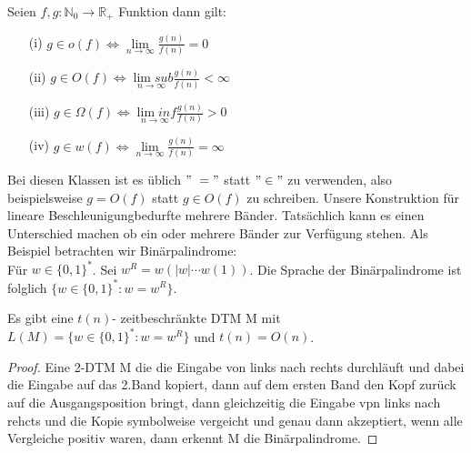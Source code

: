     Seien \(f, g : \mathbb{N}_0 \to \mathbb{R}_+\) Funktion dann gilt: 
    \begin{itemize}
        \item [(i)] \(g \in o(f) \Leftrightarrow \underset{n \to \infty}{\lim} \frac{g(n)}{f(n)} = 0\)
        \item [(ii)] \(g \in O(f) \Leftrightarrow \underset{n \to \infty}{\lim sub} \frac{g(n)}{f(n)} < \infty\)
        \item [(iii)] \(g \in \Omega(f) \Leftrightarrow \underset{n \to \infty}{\lim inf} \frac{g(n)}{f(n)} > 0\)
        \item [(iv)]\(g \in w(f) \Leftrightarrow \underset{n \to \infty}{\lim} \frac{g(n)}{f(n)} = \infty\)
    \end{itemize}
    Bei diesen Klassen ist es üblich \("\ = "\) statt \(" \in "\) zu verwenden, also beispielsweise \(g = O(f)\) statt \(g \in O(f)\) zu schreiben.
    \medskip
    Unsere Konstruktion für lineare Beschleunigungbedurfte mehrere Bänder. Tatsächlich kann es einen Unterschied machen ob ein oder mehrere Bänder zur Verfügung stehen. Als Beispiel betrachten wir Binärpalindrome:\\ Für \(w \in \{0, 1\}^*\). Sei \(w^R = w(|w| \cdots w(1))\). Die Sprache der Binärpalindrome ist folglich \(\{w \in \{0, 1\}^* : w = w^R \}\).

    Es gibt eine \(t(n)\)- zeitbeschränkte DTM M mit \(L(M) = \{w \in \{0, 1\}^* : w = w^R\}\) und \(t(n) = O(n)\).
    \begin{proof}
        Eine 2-DTM M die die Eingabe von links nach rechts durchläuft und dabei die Eingabe auf das 2.Band kopiert, dann auf dem ersten Band den Kopf zurück auf die Ausgangsposition bringt, dann gleichzeitig die Eingabe vpn links nach rehcts und die Kopie symbolweise vergeicht und genau dann akzeptiert, wenn alle Vergleiche positiv waren, dann erkennt M die Binärpalindrome.
    \end{proof}

